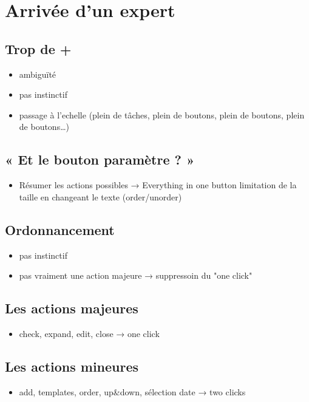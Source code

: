 \documentclass[11pt]{article}
\begin{document}
\section{Arrivée d'un expert}


\subsection{Trop de +}
\begin{itemize}
\item ambiguïté
\item pas instinctif
\item passage à l'echelle (plein de tâches, plein de boutons, plein de
  boutons, plein de boutons\ldots{})
\end{itemize}


\subsection{« Et le bouton paramètre ? »}
\begin{itemize}
\item Résumer les actions possibles → Everything in one button
  limitation de la taille en changeant le texte (order/unorder)
\end{itemize}


\subsection{Ordonnancement}
\begin{itemize}
\item pas instinctif
\item pas vraiment une action majeure
  → suppressoin du "one click"
\end{itemize}


\subsection{Les actions majeures}
\begin{itemize}
\item check, expand, edit, close
  → one click
\end{itemize}


\subsection{Les actions mineures}
\begin{itemize}
\item add, templates, order, up\&down, sélection date
  → two clicks
\end{itemize}
\end{document}
